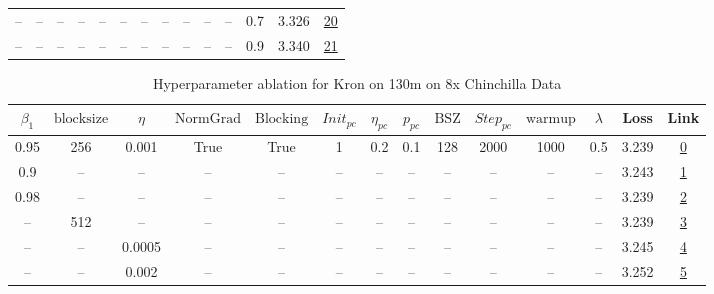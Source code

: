 \begin{table}[H]
\begin{tabular}{cccccccccccccc}
-- & -- & -- & -- & -- & -- & -- & -- & -- & -- & -- & 0.7 & 3.326 & \href{https://wandb.ai/stanford-mercury/optimizer-scaling/runs/sweep-130m-10B-kroncf91b2lr0.002-wd0.7-b10.95-plr0.2-pis1-gn1-no-bb43f6}{20} \\
-- & -- & -- & -- & -- & -- & -- & -- & -- & -- & -- & 0.9 & 3.340 & \href{https://wandb.ai/stanford-mercury/optimizer-scaling/runs/sweep-130m-10B-kron5e6407lr0.002-wd0.9-b10.95-plr0.2-pis1-gn1-no-8578c1}{21} \\
\bottomrule
\end{tabular}
\end{table}

\begin{table}[H]
\centering
\caption{Hyperparameter ablation for Kron on 130m on 8x Chinchilla Data}
\label{tab:ablation_kron_130m_8}
\begin{tabular}{cccccccccccccc}
\toprule
$\beta_1$ & $\mathrm{block size}$ & $\eta$ & $\mathrm{NormGrad}$ & $\mathrm{Blocking}$ & $Init_{pc}$ & $\eta_{pc}$ & $p_{pc}$ & $\mathrm{BSZ}$ & $Step_{pc}$ & $\mathrm{warmup}$ & $\lambda$ & Loss & Link \\
\midrule
0.95 & 256 & 0.001 & True & True & 1 & 0.2 & 0.1 & 128 & 2000 & 1000 & 0.5 & 3.239 & \href{https://wandb.ai/stanford-mercury/optimizer-scaling/runs/sweep-130m-21B-kronz680ae4lr0.001-wd0.5-b10.95-plr0.2-pis1-gn1-n-f84dac}{0} \\
\midrule
0.9 & -- & -- & -- & -- & -- & -- & -- & -- & -- & -- & -- & 3.243 & \href{https://wandb.ai/stanford-mercury/optimizer-scaling/runs/sweep-130m-21B-kron5f284blr0.001-wd0.5-b10.9-plr0.2-pis1-gn1-nor-853b92}{1} \\
0.98 & -- & -- & -- & -- & -- & -- & -- & -- & -- & -- & -- & 3.239 & \href{https://wandb.ai/stanford-mercury/optimizer-scaling/runs/sweep-130m-21B-kron6aaf70lr0.001-wd0.5-b10.98-plr0.2-pis1-gn1-no-c11287}{2} \\
-- & 512 & -- & -- & -- & -- & -- & -- & -- & -- & -- & -- & 3.239 & \href{https://wandb.ai/stanford-mercury/optimizer-scaling/runs/sweep-130m-21B-kron545c17lr0.001-wd0.5-b10.95-plr0.2-pis1-gn1-no-826ad5}{3} \\
-- & -- & 0.0005 & -- & -- & -- & -- & -- & -- & -- & -- & -- & 3.245 & \href{https://wandb.ai/stanford-mercury/optimizer-scaling/runs/sweep-130m-21B-krona6b124lr0.0005-wd0.5-b10.95-plr0.2-pis1-gn1-n-220dba}{4} \\
-- & -- & 0.002 & -- & -- & -- & -- & -- & -- & -- & -- & -- & 3.252 & \href{https://wandb.ai/stanford-mercury/optimizer-scaling/runs/sweep-130m-21B-kron570784lr0.002-wd0.5-b10.95-plr0.2-pis1-gn1-no-52c059}{5} \\

\end{tabular}
\end{table}
